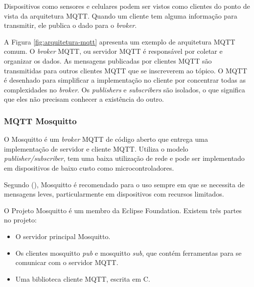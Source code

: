 \newpage

Dispositivos como sensores e celulares podem ser vistos como clientes do ponto de vista da arquitetura MQTT. Quando um cliente tem alguma informação para transmitir, ele publica o dado para o \textit {broker}.

A Figura \ref{fig:arquitetura-mqtt} apresenta um exemplo de arquitetura MQTT comum. O \textit {broker} MQTT, ou servidor MQTT é responsável por coletar e organizar os dados. As mensagens publicadas por clientes MQTT são transmitidas para outros clientes MQTT que se inscreverem ao tópico. O MQTT é desenhado para simplificar a implementação no cliente por concentrar todas as complexidades no \textit {broker}. Os \textit {publishers} e \textit {subscribers} são isolados, o que significa que eles não precisam conhecer a existência do outro.

\subsubsection{MQTT Mosquitto}

O Mosquitto é um \textit{broker} MQTT de código aberto \cite{Kodali2017} que entrega uma implementação de servidor e cliente MQTT. Utiliza o modelo \textit{publisher/subscriber}, tem uma baixa utilização de rede e pode ser implementado em dispositivos de baixo custo como microcontroladores. \cite{Light}

Segundo \citeauthor{Light} (\citeyear{Light}), Mosquitto é recomendado para o uso sempre em que se necessita de mensagens leves, particularmente em dispositivos com recursos limitados.

O Projeto Mosquitto é um membro da Eclipse Foundation. Existem três partes no projeto:

\begin{itemize}
	\item O servidor principal Mosquitto.
	\item Os clientes mosquitto \textit{pub} e mosquitto \textit{sub}, que contém ferramentas para se comunicar com o servidor MQTT.
	\item Uma biblioteca cliente MQTT, escrita em C.
\end{itemize}


